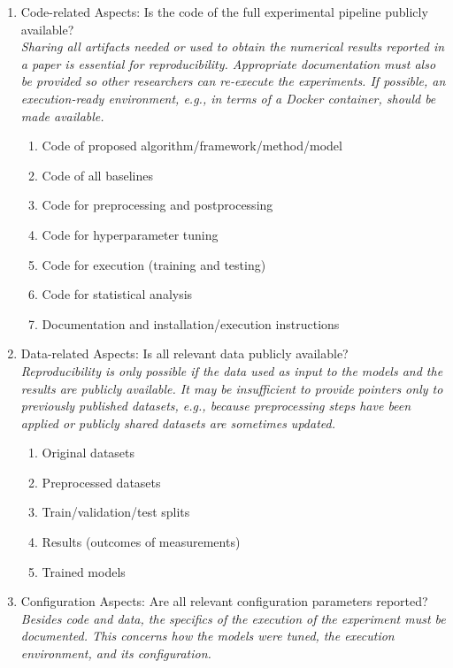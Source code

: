 \documentclass{article}
\begin{document}
\begin{enumerate}
\item Code-related Aspects: Is the code of the full experimental pipeline publicly available? \\ 
\emph{Sharing all artifacts needed or used to obtain the numerical results reported in a paper is essential for reproducibility. Appropriate documentation must also be provided so other researchers can re-execute the experiments. If possible, an execution-ready environment, e.g., in terms of a Docker container, should be made available.}
\begin{enumerate}[label*=\arabic*.]
    \item Code of proposed algorithm/framework/method/model
    \item Code of all baselines
    \item Code for preprocessing and postprocessing
    \item Code for hyperparameter tuning
    \item Code for execution (training and testing)
    \item Code for statistical analysis
    \item Documentation and installation/execution instructions
\end{enumerate}
\item Data-related Aspects: Is all relevant data publicly available? \\ 
\emph{Reproducibility is only possible if the data used as input to the models and the results are publicly available. It may be insufficient to provide pointers only to previously published datasets, e.g., because preprocessing steps have been applied or publicly shared datasets are sometimes updated.}
    \begin{enumerate}[label*=\arabic*.]
        \item Original datasets
        \item Preprocessed datasets
        \item Train/validation/test splits
        \item Results (outcomes of measurements)
        \item Trained models
    \end{enumerate}
\item Configuration Aspects: Are all relevant configuration parameters reported? \\ 
\emph{Besides code and data, the specifics of the execution of the experiment must be documented. This concerns how the models were tuned, the execution environment, and its configuration.}

\end{enumerate}
\end{document}
